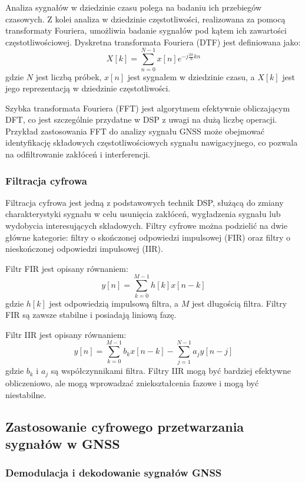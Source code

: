 Analiza sygnałów w dziedzinie czasu polega na badaniu ich przebiegów czasowych. Z kolei analiza w dziedzinie częstotliwości, realizowana za pomocą transformaty Fouriera, umożliwia badanie sygnałów pod kątem ich zawartości częstotliwościowej. Dyskretna transformata Fouriera (DTF) jest definiowana jako:
\[ X[k] = \sum_{n=0}^{N-1} x[n] e^{-j \frac{2\pi}{N} kn} \]
gdzie $N$ jest liczbą próbek, $x[n]$ jest sygnałem w dziedzinie czasu, a $X[k]$ jest jego reprezentacją w dziedzinie częstotliwości.

Szybka transformata Fouriera (FFT) jest algorytmem efektywnie obliczającym DFT, co jest szczególnie przydatne w DSP z uwagi na dużą liczbę operacji. Przykład zastosowania FFT do analizy sygnału GNSS może obejmować identyfikację składowych częstotliwościowych sygnału nawigacyjnego, co pozwala na odfiltrowanie zakłóceń i interferencji.

\subsubsection{Filtracja cyfrowa}

Filtracja cyfrowa jest jedną z podstawowych technik DSP, służącą do zmiany charakterystyki sygnału w celu usunięcia zakłóceń, wygładzenia sygnału lub wydobycia interesujących składowych. Filtry cyfrowe można podzielić na dwie główne kategorie: filtry o skończonej odpowiedzi impulsowej (FIR) oraz filtry o nieskończonej odpowiedzi impulsowej (IIR).

Filtr FIR jest opisany równaniem:
\[ y[n] = \sum_{k=0}^{M-1} h[k] x[n-k] \]
gdzie $h[k]$ jest odpowiedzią impulsową filtra, a $M$ jest długością filtra. Filtry FIR są zawsze stabilne i posiadają liniową fazę.

Filtr IIR jest opisany równaniem:
\[ y[n] = \sum_{k=0}^{M-1} b_k x[n-k] - \sum_{j=1}^{N-1} a_j y[n-j] \]
gdzie $b_k$ i $a_j$ są współczynnikami filtra. Filtry IIR mogą być bardziej efektywne obliczeniowo, ale mogą wprowadzać zniekształcenia fazowe i mogą być niestabilne.

\subsection{Zastosowanie cyfrowego przetwarzania sygnałów w GNSS}

\subsubsection{Demodulacja i dekodowanie sygnałów GNSS}

